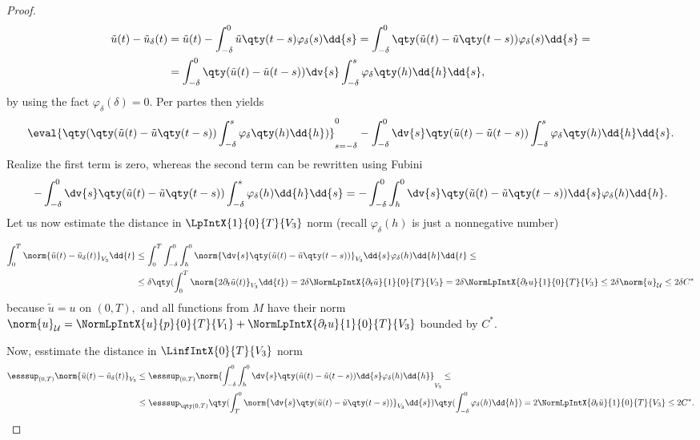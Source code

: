 \begin{proof}
	\begin{align*}
		\tilde{u}(t) - \tilde{u}_{\delta}(t) &= \tilde{u}(t) - \int_{-\delta}^0 \tilde{u}\qty(t-s)\varphi_{\delta}(s)\dd{s} = \int_{-\delta}^0\qty(\tilde{u}(t)-\tilde{u}\qty(t-s))\varphi_{\delta}(s)\dd{s} = \\
		&=\int_{-\delta}^0\qty(\tilde{u}(t)-\tilde{u}(t-s))\dv{s} \int_{-\delta}^{s}\varphi_{\delta}\qty(h)\dd{h}\dd{s},
	\end{align*}
	by using the fact $\varphi_{\delta}(\delta) = 0.$ Per partes then yields
	\[
		\eval{\qty(\qty(\tilde{u}(t)-\tilde{u}\qty(t-s))\int_{-\delta}^s \varphi_{\delta}\qty(h)\dd{h})}^0_{s=-\delta}- \int_{-\delta}^0 \dv{s} \qty(\tilde{u}(t)-\tilde{u}(t-s))\int_{-\delta}^s \varphi_{\delta}\qty(h)\dd{h}\dd{s}.
	\]
	Realize the first term is zero, whereas the second term can be rewritten using Fubini 
	\[
		- \int_{-\delta}^0 \dv{s} \qty(\tilde{u}(t) - \tilde{u}\qty(t-s))\int_{-\delta}^s \varphi_{\delta}(h)\dd{h}\dd{s} = -\int_{-\delta}^0 \int_{h}^0 \dv{s} \qty(\tilde{u}(t) - \tilde{u}\qty(t-s))\dd{s}\varphi_{\delta}(h)\dd{h}.
	\]
	Let us now estimate the distance in $\LpIntX{1}{0}{T}{V_3}$ norm (recall $\varphi_{\delta}(h)$ is just a nonnegative number)

	\begin{align*}
		\int_0^T \norm{\tilde{u}(t) - \tilde{u}_{\delta}(t)}_{V_3} \dd{t} &\leq \int_0^T \int_{-\delta}^0 \int_h^0 \norm{\dv{s} \qty(\tilde{u}(t) - \tilde{u}\qty(t-s))}_{V_3}\dd{s} \varphi_{\delta}(h) \dd{h} \dd{t}\leq \\
								  &\leq \delta \qty(\int_0^T \norm{2 \partial_t \tilde{u}(t)}_{V_3} \dd{t}) = 2 \delta \NormLpIntX{\partial_t \tilde{u}}{1}{0}{T}{V_3} = 2 \delta \NormLpIntX{\partial_t u}{1}{0}{T}{V_3} \leq 2 \delta \norm{u}_{\mathcal{U}} \leq 2 \delta C^{*}
	\end{align*}
	because $\tilde{u} = u$ on $(0,T),$ and all functions from $M$ have their norm $\norm{u}_{\mathcal{U}} = \NormLpIntX{u}{p}{0}{T}{V_1} + \NormLpIntX{\partial_t u}{1}{0}{T}{V_3}$ bounded by $C^{*}.$

	Now, esstimate the distance in $\LinfIntX{0}{T}{V_3}$ norm
	\begin{align*}
		\esssup_{(0,T)}\norm{\tilde{u}(t) - \tilde{u}_{\delta}(t)}_{V_3} &\leq \esssup_{(0,T)} \norm{\int_{-\delta}^0 \int_h^0 \dv{s} \qty(\tilde{u}(t) -\tilde{u}(t-s))\dd{s} \varphi_{\delta}(h) \dd{h}}_{V_3} \leq \\
		&\leq \esssup_{\qty(0,T)}\qty(\int_T^0 \norm{\dv{s}\qty(\tilde{u}(t) - \tilde{u}\qty(t-s))}_{V_3}\dd{s})\qty(\int_{-\delta}^0 \varphi_{\delta}(h)\dd{h}) = 2 \NormLpIntX{\partial_t \tilde{u}}{1}{0}{T}{V_3} \leq 2 C^{*}.
	\end{align*}


\end{proof}

